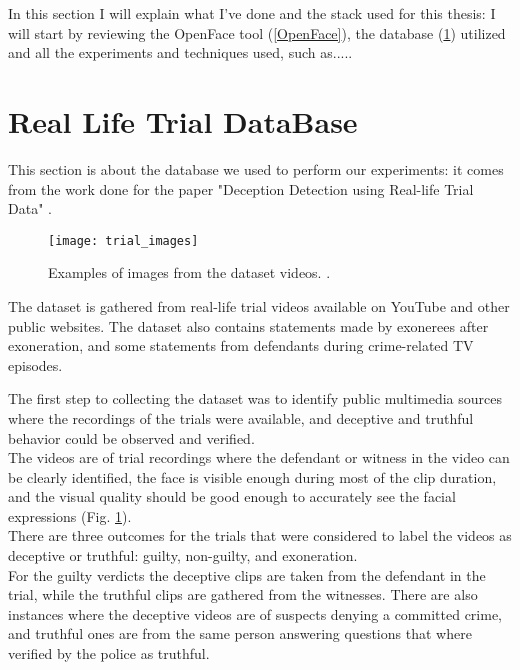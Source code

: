 In this section I will explain what I've done and the stack used for this thesis: I will start by reviewing the OpenFace tool (\ref{OpenFace}), the database (\ref{rldb}) utilized and all the experiments and techniques used, such as.....


\section{Real Life Trial DataBase} \label{rldb}
This section is about the database we used to perform our experiments: it comes from the work done for the paper "Deception Detection using Real-life Trial Data" \cite{Perez-Rosas:2015:DDU:2818346.2820758}.

\begin{figure}[H]
	\centering
	\texttt{[image: trial\_images]}
	\caption{Examples of images from the dataset videos. \cite{Perez-Rosas:2015:DDU:2818346.2820758}.}
	\label{fig:trial_images}
\end{figure}


The dataset is gathered from real-life trial videos available on YouTube and other public websites. The dataset also contains statements made by exonerees after exoneration, and some statements from defendants during crime-related TV episodes.

The first step to collecting the dataset was to identify public multimedia sources where the recordings of the trials were available, and deceptive and truthful behavior could be observed and verified.\\
The videos are of trial recordings where the defendant or witness in the video can be clearly identified, the face is visible enough during most of the clip duration, and the visual quality should be good enough to accurately see the facial expressions (Fig. \ref{fig:trial_images}).\\
There are three outcomes for the trials that were considered to label the videos as deceptive or truthful: guilty, non-guilty, and exoneration. \\
For the guilty verdicts the deceptive clips are taken from the defendant in the trial, while the truthful clips are gathered from the witnesses. There are also instances where the deceptive videos are of suspects denying a committed crime, and truthful ones are from the same person answering questions that where verified by the police as truthful.

